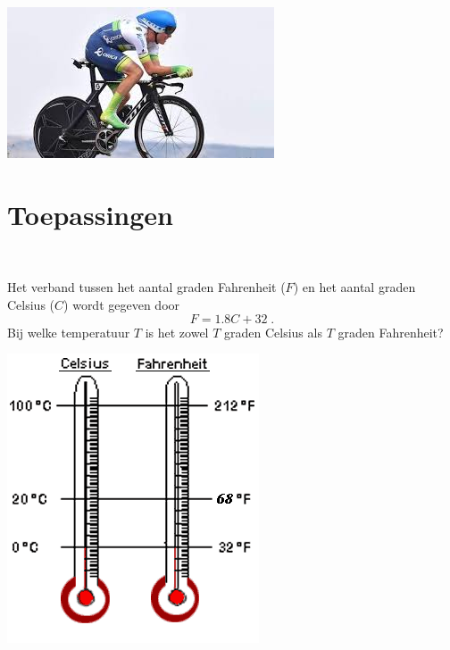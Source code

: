 \documentclass[12pt]{article}
\begin{document}
\begin{oefening}
\begin{enumerate}[(a)]
\begin{enumerate}[(A)]
    \end{enumerate}
    \begin{center}
      \includegraphics{tijdrit}
    \end{center}
  \end{enumerate}

\end{oefening}

\newpage
\section{Toepassingen}

\begin{oefening}\\
\begin{minipage}{0.75\textwidth}
  Het verband tussen het aantal graden Fahrenheit ($F$) en het aantal graden Celsius ($C$) wordt gegeven door$$F=1.8C+32\;.$$
  Bij welke temperatuur $T$ is het zowel $T$ graden Celsius als $T$ graden Fahrenheit?
\end{minipage}
\begin{minipage}{0.2\textwidth}
  \includegraphics[width=\textwidth]{CelsiusFahrenheitThermo}
\end{minipage}
\end{oefening}
\end{document}
